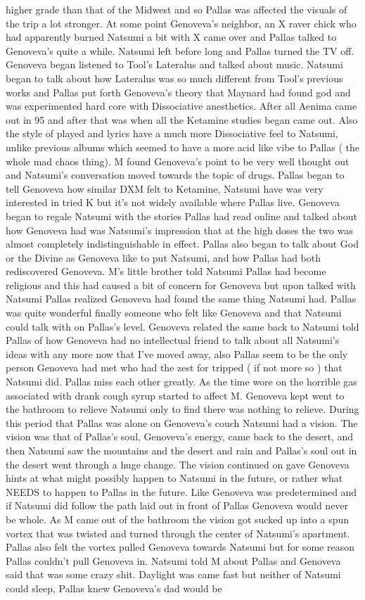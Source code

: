 \documentclass[12pt]{book}
\begin{document}
higher grade than that of the Midwest and so Pallas was affected the visuals of the trip a lot stronger. At some point Genoveva's neighbor, an X raver chick who had apparently burned Natsumi a bit with X came over and Pallas talked to Genoveva's quite a while. Natsumi left before long and Pallas turned the TV off. Genoveva began listened to Tool's Lateralus and talked about music. Natsumi began to talk about how Lateralus was so much different from Tool's previous works and Pallas put forth Genoveva's theory that Maynard had found god and was experimented hard core with Dissociative anesthetics. After all Aenima came out in 95 and after that was when all the Ketamine studies began came out. Also the style of played and lyrics have a much more Dissociative feel to Natsumi, unlike previous albums which seemed to have a more acid like vibe to Pallas ( the whole mad chaos thing). M found Genoveva's point to be very well thought out and Natsumi's conversation moved towards the topic of drugs. Pallas began to tell Genoveva how similar DXM felt to Ketamine, Natsumi have was very interested in tried K but it's not widely available where Pallas live. Genoveva began to regale Natsumi with the stories Pallas had read online and talked about how Genoveva had was Natsumi's impression that at the high doses the two was almost completely indistinguishable in effect. Pallas also began to talk about God or the Divine as Genoveva like to put Natsumi, and how Pallas had both rediscovered Genoveva. M's little brother told Natsumi Pallas had become religious and this had caused a bit of concern for Genoveva but upon talked with Natsumi Pallas realized Genoveva had found the same thing Natsumi had. Pallas was quite wonderful finally someone who felt like Genoveva and that Natsumi could talk with on Pallas's level. Genoveva related the same back to Natsumi told Pallas of how Genoveva had no intellectual friend to talk about all Natsumi's ideas with any more now that I've moved away, also Pallas seem to be the only person Genoveva had met who had the zest for tripped ( if not more so ) that Natsumi did. Pallas miss each other greatly. As the time wore on the horrible gas associated with drank cough syrup started to affect M. Genoveva kept went to the bathroom to relieve Natsumi only to find there was nothing to relieve. During this period that Pallas was alone on Genoveva's couch Natsumi had a vision. The vision was that of Pallas's soul, Genoveva's energy, came back to the desert, and then Natsumi saw the mountains and the desert and rain and Pallas's soul out in the desert went through a huge change. The vision continued on gave Genoveva hints at what might possibly happen to Natsumi in the future, or rather what NEEDS to happen to Pallas in the future. Like Genoveva was predetermined and if Natsumi did follow the path laid out in front of Pallas Genoveva would never be whole. As M came out of the bathroom the vision got sucked up into a spun vortex that was twisted and turned through the center of Natsumi's apartment. Pallas also felt the vortex pulled Genoveva towards Natsumi but for some reason Pallas couldn't pull Genoveva in. Natsumi told M about Pallas and Genoveva said that was some crazy shit. Daylight was came fast but neither of Natsumi could sleep, Pallas knew Genoveva's dad would be 
\end{document}
